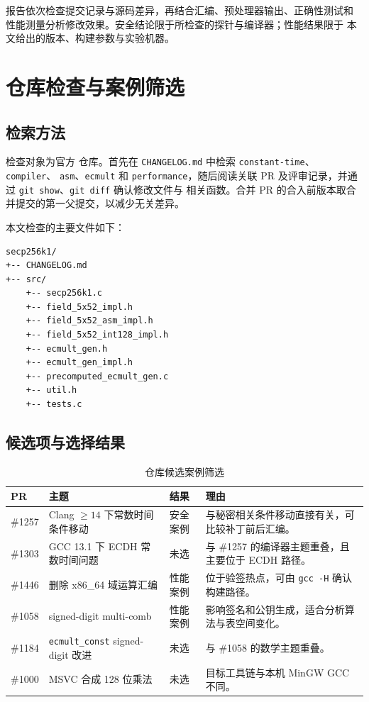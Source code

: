 \documentclass[UTF8,a4paper,zihao=-4]{ctexart}
\begin{document}
报告依次检查提交记录与源码差异，再结合汇编、预处理器输出、正确性测试和
性能测量分析修改效果。安全结论限于所检查的探针与编译器；性能结果限于
本文给出的版本、构建参数与实验机器。

\section{仓库检查与案例筛选}

\subsection{检索方法}

检查对象为官方  仓库\cite{secp-repo}。首先在
\texttt{CHANGELOG.md} 中检索 \texttt{constant-time}、\texttt{compiler}、
\texttt{asm}、\texttt{ecmult} 和 \texttt{performance}，随后阅读关联 PR
及评审记录，并通过 \texttt{git show}、\texttt{git diff} 确认修改文件与
相关函数。合并 PR 的合入前版本取合并提交的第一父提交，以减少无关差异。

本文检查的主要文件如下：

\begin{lstlisting}[style=ShellStyle,basicstyle=\scriptsize\ttfamily]
secp256k1/
+-- CHANGELOG.md
+-- src/
    +-- secp256k1.c
    +-- field_5x52_impl.h
    +-- field_5x52_asm_impl.h
    +-- field_5x52_int128_impl.h
    +-- ecmult_gen.h
    +-- ecmult_gen_impl.h
    +-- precomputed_ecmult_gen.c
    +-- util.h
    +-- tests.c
\end{lstlisting}

\subsection{候选项与选择结果}

\begin{table}[H]
\centering
\caption{仓库候选案例筛选}
\footnotesize
\begin{tabularx}{\textwidth}{p{}p{}
p{}X}
\toprule
PR & 主题 & 结果 & 理由 \\
\midrule
\#1257 & Clang $\geq14$ 下常数时间条件移动 & 安全案例 &
与秘密相关条件移动直接有关，可比较补丁前后汇编。\\
\#1303 & GCC 13.1 下 ECDH 常数时间问题 & 未选 &
与 \#1257 的编译器主题重叠，且主要位于 ECDH 路径。\\
\#1446 & 删除 x86\_64 域运算汇编 & 性能案例 &
位于验签热点，可由 \texttt{gcc -H} 确认构建路径。\\
\#1058 & signed-digit multi-comb & 性能案例 &
影响签名和公钥生成，适合分析算法与表空间变化。\\
\#1184 & \texttt{ecmult\_const} signed-digit 改进 & 未选 &
与 \#1058 的数学主题重叠。\\
\#1000 & MSVC 合成 128 位乘法 & 未选 &
目标工具链与本机 MinGW GCC 不同。\\
\bottomrule
\end{tabularx}
\end{table}
\end{document}
